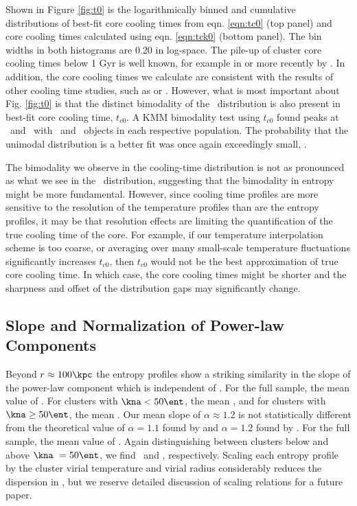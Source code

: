 \documentclass{emulateapj}
\begin{document}
Shown in Figure \ref{fig:t0} is the logarithmically binned and
cumulative distributions of best-fit core cooling times from
eqn. \ref{eqn:tc0} (top panel) and core cooling times calculated using
eqn. \ref{eqn:tck0} (bottom panel). The bin widths in both histograms
are 0.20 in log-space. The pile-up of cluster core cooling times below
1 Gyr is well known, for example in \citet{hu85} or more recently by
\citet{dunn08}. In addition, the core cooling times we calculate are
consistent with the results of other cooling time studies, such as
\citet{1998MNRAS.298..416P} or \citet{2008arXiv0802.1864R}. However,
what is most important about Fig. \ref{fig:t0} is that the distinct
bimodality of the \kna\ distribution is also present in best-fit core
cooling time, $t_{c0}$. A KMM bimodality test using $t_{c0}$ found
peaks at \tckmma\ and \tckmmb\ with \tckmmc\ and \tckmmd\ objects in
each respective population. The probability that the unimodal
distribution is a better fit was once again exceedingly small,
\tckmme.

The bimodality we observe in the cooling-time distribution is not as
pronounced as what we see in the \kna\ distribution, suggesting that
the bimodality in entropy might be more fundamental. However, since
cooling time profiles are more sensitive to the resolution of the
temperature profiles than are the entropy profiles, it may be that
resolution effects are limiting the quantification of the true cooling
time of the core. For example, if our temperature interpolation scheme
is too coarse, or averaging over many small-scale temperature
fluctuations significantly increases $t_{c0}$, then $t_{c0}$ would not
be the best approximation of true core cooling time. In which case,
the core cooling times might be shorter and the sharpness and offset
of the distribution gaps may significantly change.

\subsection{Slope and Normalization of Power-law Components}
\label{sec:slopes}


Beyond $r \approx 100 \kpc$ the entropy profiles show a striking
similarity in the slope of the power-law component which is
independent of \kna. For the full sample, the mean value of
\alphafs. For clusters with $\kna < 50 \ent$, the mean
\alphaga, and for clusters with $\kna \geq 50 \ent$, the mean
\alphagb. Our mean slope of $\alpha \approx 1.2$ is not statistically
different from the theoretical value of $\alpha = 1.1$ found by
\citet{tozzi01} and $\alpha = 1.2$ found by \citet{vkb05}. For the
full sample, the mean value of \khunfs. Again distinguishing between
clusters below and above $\kna\ = 50 \ent$, we find \khunga\ and
\khungb, respectively. Scaling each entropy profile by the cluster
virial temperature and virial radius considerably reduces the
dispersion in \khun, but we reserve detailed discussion of scaling
relations for a future paper.
\end{document}
